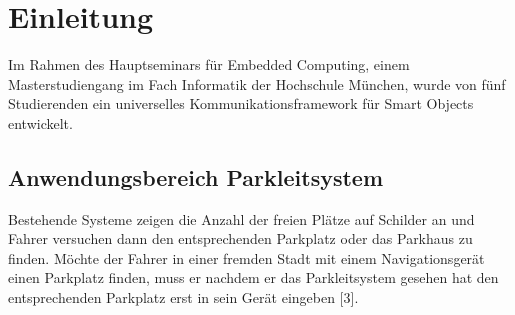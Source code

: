 \section{Einleitung}

Im Rahmen des Hauptseminars für Embedded Computing, einem Masterstudiengang im Fach Informatik der Hochschule München, wurde von fünf Studierenden ein universelles Kommunikationsframework für Smart Objects entwickelt.


\subsection{Anwendungsbereich Parkleitsystem}

Bestehende Systeme zeigen die Anzahl der freien Plätze auf Schilder an und Fahrer versuchen dann den entsprechenden Parkplatz oder das Parkhaus zu finden. Möchte der Fahrer in einer fremden Stadt mit einem Navigationsgerät einen Parkplatz finden, muss er nachdem er das Parkleitsystem gesehen hat den entsprechenden Parkplatz erst in sein Gerät eingeben [3].

